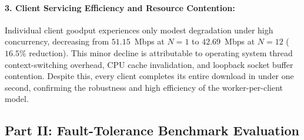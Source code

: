 \documentclass[11pt,a4paper]{article}
\begin{document}
\paragraph{3. Client Servicing Efficiency and Resource Contention:}
Individual client goodput experiences only modest degradation under high concurrency, decreasing from $51.15$~Mbps at $N=1$ to $42.69$~Mbps at $N=12$ ($16.5\%$ reduction). This minor decline is attributable to operating system thread context-switching overhead, CPU cache invalidation, and loopback socket buffer contention. Despite this, every client completes its entire download in under one second, confirming the robustness and high efficiency of the worker-per-client model.

\subsection{Part II: Fault-Tolerance Benchmark Evaluation}
\end{document}
